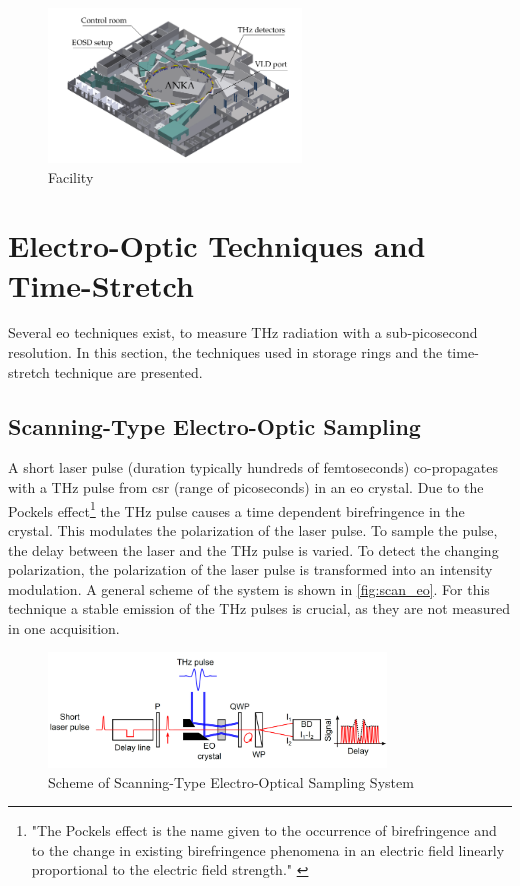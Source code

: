 \begin{figure}[tbh]
	\centering
	\includegraphics[width = 0.6\textwidth]{chap/02-theory/img/kara.png}
	\caption{Facility \cite{rota2018}}
	\label{fig:kara}
\end{figure}

\newpage 
\section{Electro-Optic Techniques and Time-Stretch}
Several \gls{eo} techniques exist, to measure THz radiation with a sub-picosecond resolution.
In this section, the techniques used in storage rings and the time-stretch technique are presented. 

\subsection{Scanning-Type Electro-Optic Sampling}
A short laser pulse (duration typically hundreds of femtoseconds) co-propagates with a THz pulse from \gls{csr} (range of picoseconds) in an \gls{eo} crystal. Due to the Pockels effect\footnote{"The Pockels effect is the name given to the occurrence of
birefringence and to the change in existing birefringence phenomena in an electric field linearly proportional to the electric
field strength." \cite{pockels}} the THz pulse causes a time dependent birefringence in the crystal.
This modulates the polarization of the laser pulse.
To sample the pulse, the delay between the laser and the THz pulse is varied.
To detect the changing polarization, the polarization of the laser pulse is transformed into an intensity modulation.
A general scheme of the system is shown in \autoref{fig:scan_eo}.
For this technique a stable emission of the THz pulses is crucial, as they are not measured in one acquisition. \cite{roussel2014}
\begin{figure}[H]
	\centering
	\includegraphics[width = 0.8\textwidth]{chap/02-theory/img/scanning_eo}
	\caption{Scheme of Scanning-Type Electro-Optical Sampling System \cite{roussel2014}}
	\label{fig:scan_eo}
\end{figure}

